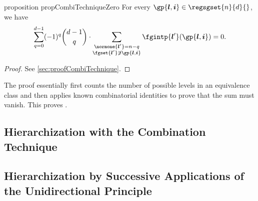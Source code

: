 \begin{restatable}{%
  proposition%
}{%
  propCombiTechniqueZero%
}
  \label{prop:combiTechniqueZero}
  For every $\gp{\*l,\*i} \in \regsgset{n}{d}{}$, we have
  \begin{equation}
    \sum_{q=0}^{d-1} (-1)^q \binom{d-1}{q} \cdot
    \sum_{\substack{\normone{\*l'} = n - q\\\fgset{\*l'} \notni \gp{\*l,\*i}}}
    \fgintp{\*l'}(\gp{\*l,\*i})
    = 0.
  \end{equation}
\end{restatable}

\begin{proof}
  See \cref{sec:proofCombiTechnique}.
\end{proof}

The proof essentially first counts the number of possible levels in
an equivalence class and then applies known combinatorial identities
to prove that the sum must vanish.
This proves .



\subsection{Hierarchization with the Combination Technique}
\label{sec:432hierarchizationCombiTechnique}

\blindtext{}

\subsection{%
  Hierarchization by Successive Applications of the Unidirectional Principle%
}
\label{sec:433hierarchizationSuccessiveUP}

\blindtext{}
